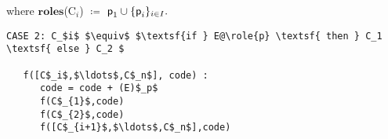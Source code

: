 where $\mathbf{roles}$(C$_i$) $\coloneqq$ $\textsf{p}_1  \cup \{\textsf{p}_i\}_{i\in I}.$

	
\begin{lstlisting}[mathescape=true,backgroundcolor={}]
CASE 2: C_$i$ $\equiv$ $\textsf{if } E@\role{p} \textsf{ then } C_1 \textsf{ else } C_2 $

   f([C$_i$,$\ldots$,C$_n$], code) :
      code = code + (E)$_p$
      f(C$_{1}$,code)
      f(C$_{2}$,code)
      f([C$_{i+1}$,$\ldots$,C$_n$],code)
      

      
	
\end{lstlisting}

